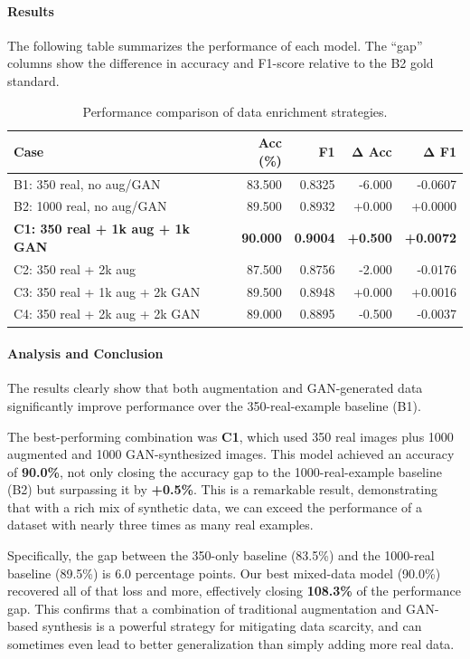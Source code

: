 \paragraph{Results}
The following table summarizes the performance of each model. The ``gap'' columns show the difference in accuracy and F1-score relative to the B2 gold standard.

\begin{table}[H]
	\centering
	\caption{Performance comparison of data enrichment strategies.}
	\label{tab:gan_aug_results}
	\begin{tabular}{lrrrr}
		\toprule
		\textbf{Case} & \textbf{Acc (\%)} & \textbf{F1} & \textbf{Δ Acc} & \textbf{Δ F1} \\
		\midrule
		B1: 350 real, no aug/GAN & 83.500 & 0.8325 & -6.000 & -0.0607 \\
		B2: 1000 real, no aug/GAN & 89.500 & 0.8932 & +0.000 & +0.0000 \\
		\midrule
		\textbf{C1: 350 real + 1k aug + 1k GAN} & \textbf{90.000} & \textbf{0.9004} & \textbf{+0.500} & \textbf{+0.0072} \\
		C2: 350 real + 2k aug & 87.500 & 0.8756 & -2.000 & -0.0176 \\
		C3: 350 real + 1k aug + 2k GAN & 89.500 & 0.8948 & +0.000 & +0.0016 \\
		C4: 350 real + 2k aug + 2k GAN & 89.000 & 0.8895 & -0.500 & -0.0037 \\
		\bottomrule
	\end{tabular}
\end{table}

\paragraph{Analysis and Conclusion}
The results clearly show that both augmentation and GAN-generated data significantly improve performance over the 350-real-example baseline (B1).

The best-performing combination was \textbf{C1}, which used 350 real images plus 1000 augmented and 1000 GAN-synthesized images. This model achieved an accuracy of \textbf{90.0\%}, not only closing the accuracy gap to the 1000-real-example baseline (B2) but surpassing it by \textbf{+0.5\%}. This is a remarkable result, demonstrating that with a rich mix of synthetic data, we can exceed the performance of a dataset with nearly three times as many real examples.

Specifically, the gap between the 350-only baseline (83.5\%) and the 1000-real baseline (89.5\%) is 6.0 percentage points. Our best mixed-data model (90.0\%) recovered all of that loss and more, effectively closing \textbf{108.3\%} of the performance gap. This confirms that a combination of traditional augmentation and GAN-based synthesis is a powerful strategy for mitigating data scarcity, and can sometimes even lead to better generalization than simply adding more real data.

